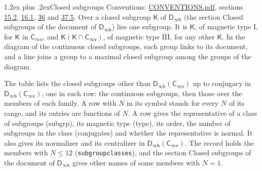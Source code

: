 \documentclass[10pt,a4paper]{article}
\makeatletter
\renewcommand\section{\@startsection{section}{1}{\z@}{-3ex plus -1ex minus -.2ex}%
  {1.2ex plus .2ex}{\normalfont\large\sffamily\bfseries\color{parttitle}}}
\numberwithin{equation}{section}
\newcommand{\grp}[1]{\mathsf{#1}}
\makeatother
\begin{document}
\section{Closed subgroups}\label{s:subgroups}
Conventions: \href{../../CONVENTIONS.pdf}{CONVENTIONS.pdf}, sections \href{../../../rotation/CONVENTIONS.pdf\#conv.15.2}{15.2}, \href{../../../rotation/CONVENTIONS.pdf\#conv.16.1}{16.1}, \href{../../CONVENTIONS.pdf\#conv.36}{36} and \href{../../CONVENTIONS.pdf\#conv.37.5}{37.5}.
\leavevmode\label{n:group.subgroup.point}Over a closed subgroup $\grp{K}$ of $\grp{D_{\infty h}}$ (the section Closed subgroups of the document of \href{../../../rotation/data/pdf/Dinfh.pdf}{$\grp{D_{\infty h}}$}) lies one subgroup. It is $\grp{K}$, of magnetic type I, for $\grp{K}$ in $\grp{C_{\infty v}}$, and $\grp{K}(\grp{K} \cap \grp{C_{\infty v}})$, of magnetic type III, for any other $\grp{K}$. In the diagram of the continuous closed subgroups, each group links to its document, and a line joins a group to a maximal closed subgroup among the groups of the diagram.
\begin{center}\end{center}
The table lists the closed subgroups other than $\grp{D_{\infty h}}(\grp{C_{\infty v}})$ up to conjugacy in $\grp{D_{\infty h}}(\grp{C_{\infty v}})$, one in each row: the continuous subgroups, then those over the members of each family. \label{n:index.family.N}A row with $N$ in its symbol stands for every $N$ of its range, and its entries are functions of $N$. \label{n:head.subgroup}\label{n:head.magnetic.type}\label{n:head.order}\label{n:head.conjugates}\label{n:head.normal}A row gives the representative of a class of subgroups (subgrp), its magnetic type (type), its order, the number of subgroups in the class (conjugates) and whether the representative is normal. \label{n:head.normalizer}\label{n:head.centralizer}It also gives its normalizer and its centralizer in $\grp{D_{\infty h}}(\grp{C_{\infty v}})$. The record holds the members with $N \le 12$ (\texttt{subgroupclasses}), and the section Closed subgroups of the document of \href{../../../rotation/data/pdf/Dinfh.pdf}{$\grp{D_{\infty h}}$} gives other names of some members with $N = 1$.
\end{document}
